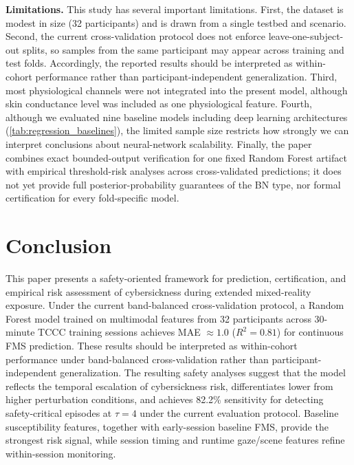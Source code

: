 \documentclass[review]{vgtc}              %
\begin{document}
\textbf{Limitations.}
This study has several important limitations. First, the dataset is modest in size (32 participants) and is drawn from a single testbed and scenario. Second, the current cross-validation protocol does not enforce leave-one-subject-out splits, so samples from the same participant may appear across training and test folds. Accordingly, the reported results should be interpreted as within-cohort performance rather than participant-independent generalization. Third, most physiological channels were not integrated into the present model, although skin conductance level was included as one physiological feature. Fourth, although we evaluated nine baseline models including deep learning architectures (\cref{tab:regression_baselines}), the limited sample size restricts how strongly we can interpret conclusions about neural-network scalability. Finally, the paper combines exact bounded-output verification for one fixed Random Forest artifact with empirical threshold-risk analyses across cross-validated predictions; it does not yet provide full posterior-probability guarantees of the BN type, nor formal certification for every fold-specific model.

\section{Conclusion}\label{sec:conclusion}

This paper presents a safety-oriented framework for prediction, certification, and empirical risk assessment of cybersickness during extended mixed-reality exposure. Under the current band-balanced cross-validation protocol, a Random Forest model trained on multimodal features from 32 participants across 30-minute TCCC training sessions achieves MAE $\approx 1.0$ ($R^2 = 0.81$) for continuous FMS prediction. These results should be interpreted as within-cohort performance under band-balanced cross-validation rather than participant-independent generalization. The resulting safety analyses suggest that the model reflects the temporal escalation of cybersickness risk, differentiates lower from higher perturbation conditions, and achieves 82.2\% sensitivity for detecting safety-critical episodes at $\tau = 4$ under the current evaluation protocol. Baseline susceptibility features, together with early-session baseline FMS, provide the strongest risk signal, while session timing and runtime gaze/scene features refine within-session monitoring.
\end{document}
